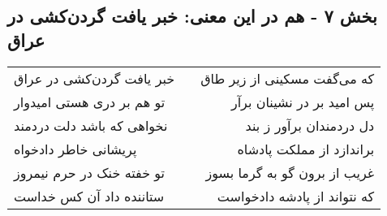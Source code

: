 \begin{center}
\section*{بخش ۷ - هم در این معنی: خبر یافت گردن‌کشی در عراق}
\label{sec:007}
\begin{longtable}{l p{0.5cm} r}
خبر یافت گردن‌کشی در عراق
&&
که می‌گفت مسکینی از زیر طاق
\\
تو هم بر دری هستی امیدوار
&&
پس امید بر در نشینان برآر
\\
نخواهی که باشد دلت دردمند
&&
دل دردمندان برآور ز بند
\\
پریشانی خاطر دادخواه
&&
براندازد از مملکت پادشاه
\\
تو خفته خنک در حرم نیمروز
&&
غریب از برون گو به گرما بسوز
\\
ستاننده داد آن کس خداست
&&
که نتواند از پادشه دادخواست
\\
\end{longtable}
\end{center}

